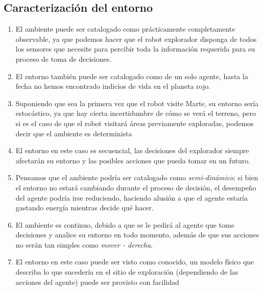 \documentclass{article}
\begin{document}
        \subsection{Caracterización del entorno}
            \begin{enumerate}
                \item El ambiente puede ser catalogado como prácticamente completamente observable, ya que podemos hacer que el robot explorador disponga de todos los sensores que necesite para percibir toda la información requerida para su proceso de toma de decisiones.
                \item El entorno también puede ser catalogado como de un solo agente, hasta la fecha no hemos encontrado indicios de vida en el planeta rojo.
                \item Suponiendo que sea la primera vez que el robot visite Marte, su entorno sería estocástico, ya que hay cierta incertidumbre de cómo se verá el terreno, pero si es el caso de que el robot visitará áreas previamente exploradas, podemos decir que el ambiente es determinista
                \item El entorno en este caso es secuencial, las decisiones del explorador siempre afectarán su entorno y las posibles acciones que pueda tomar en un futuro.
                \item Pensamos que el ambiente podría ser catalogado como \emph{semi-dinámico}; si bien el entorno no estará cambiando durante el proceso de decisión, el desempeño del agente podría irse reduciendo, haciendo alusión a que el agente estaría gastando energía mientras decide qué hacer.
                \item El ambiente es continuo, debido a que se le pedirá al agente que tome decisiones y analice su entorno en todo momento, además de que sus acciones no serán tan simples como \emph{mover - derecha}.
                \item El entorno en este caso puede ser visto como conocido, un modelo físico que describa lo que sucedería en el sitio de exploración (dependiendo de las acciones del agente) puede ser provisto con facilidad
            \end{enumerate}
\end{document}
